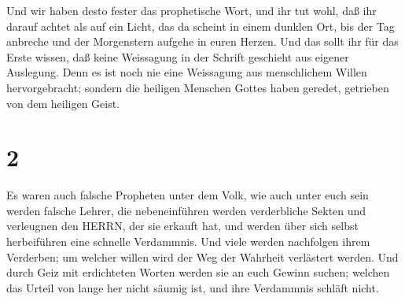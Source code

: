  Und wir haben desto fester das prophetische Wort, und ihr
tut wohl, daß ihr darauf achtet als auf ein Licht, das da scheint in
einem dunklen Ort, bis der Tag anbreche und der Morgenstern aufgehe in
euren Herzen.  Und das sollt ihr für das Erste wissen, daß
keine Weissagung in der Schrift geschieht aus eigener Auslegung.
 Denn es ist noch nie eine Weissagung aus menschlichem
Willen hervorgebracht; sondern die heiligen Menschen Gottes haben
geredet, getrieben von dem heiligen Geist.

\hypertarget{section-1}{%
\section{2}\label{section-1}}

 Es waren auch falsche Propheten unter dem Volk, wie auch
unter euch sein werden falsche Lehrer, die nebeneinführen werden
verderbliche Sekten und verleugnen den HERRN, der sie erkauft hat, und
werden über sich selbst herbeiführen eine schnelle Verdammnis.
 Und viele werden nachfolgen ihrem Verderben; um welcher
willen wird der Weg der Wahrheit verlästert werden.  Und
durch Geiz mit erdichteten Worten werden sie an euch Gewinn suchen;
welchen das Urteil von lange her nicht säumig ist, und ihre Verdammnis
schläft nicht.


